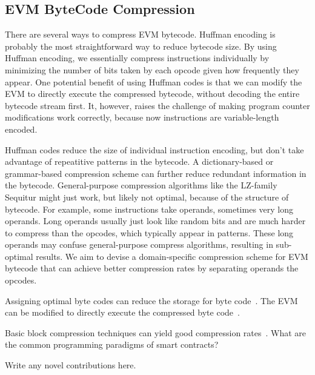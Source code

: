 
\subsection{EVM ByteCode Compression}\label{sec:evmcompress}

There are several ways to compress EVM bytecode. Huffman encoding is probably the most straightforward
way to reduce bytecode size. By using Huffman encoding, we essentially compress instructions individually
by minimizing the number of bits taken by each opcode given how frequently they appear. One potential
benefit of using Huffman codes is that we can modify the EVM to directly execute the compressed bytecode,
without decoding the entire bytecode stream first. It, however, raises the challenge of making program counter modifications work
correctly, because now instructions are variable-length encoded.

Huffman codes reduce the size of individual instruction encoding, but don't take advantage of repeatitive patterns in the bytecode.
A dictionary-based or grammar-based compression scheme can further reduce redundant information in the bytecode.
General-purpose compression algorithms like the LZ-family Sequitur might just work,
but likely not optimal, because of the structure of bytecode.
For example, some instructions take operands, sometimes very long operands.
Long operands usually just look like random bits and are much harder to compress than the opcodes, which typically appear in patterns.
These long operands may confuse general-purpose compress algorithms, resulting in sub-optimal results.
We aim to devise a domain-specific compression scheme for EVM bytecode that can achieve better compression rates
by separating operands the opcodes.

Assigning optimal byte codes can reduce the storage for byte code~\cite{aslam2010}.
The EVM can be modified to directly execute the compressed byte code~\cite{marc2003,evans2003}.

Basic block compression techniques can yield good compression rates~\cite{clausen2000}. 
What are the common programming paradigms of smart contracts?

Write any novel contributions here.

